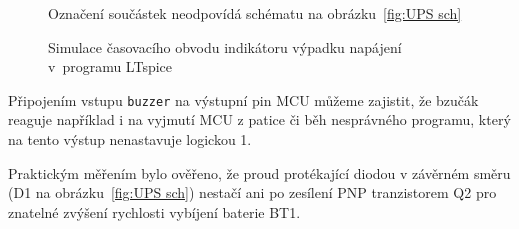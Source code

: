 \begin{figure}
    \centering
    \par\bigskip
    {\footnotesize Označení součástek neodpovídá schématu na
    obrázku~\vref{fig:UPS sch}}
    \caption{%
        Simulace časovacího obvodu indikátoru výpadku napájení v~programu
        LTspice
    }
    \label{fig:UPS RC sim}
\end{figure}

Připojením vstupu \texttt{buzzer} na výstupní pin MCU můžeme zajistit, že
bzučák reaguje například i na vyjmutí MCU z patice či běh nesprávného programu,
který na tento výstup nenastavuje logickou 1.

Praktickým měřením bylo ověřeno, že proud protékající diodou v závěrném směru
(D1 na obrázku~\vref{fig:UPS sch}) nestačí ani po zesílení PNP tranzistorem Q2
pro znatelné zvýšení rychlosti vybíjení baterie BT1.
